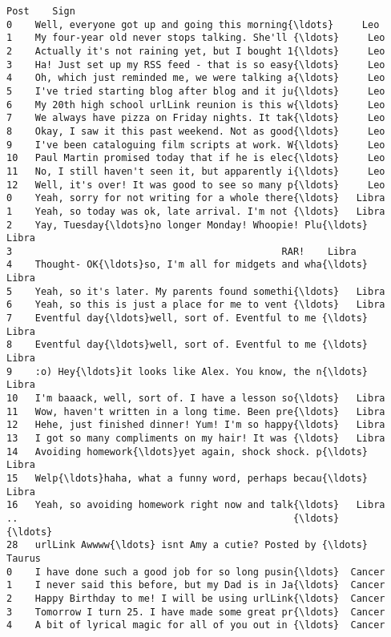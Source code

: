 \documentclass[11pt]{article}
\begin{document}
\begin{Verbatim}[commandchars=\\\{\}]
                                                 Post    Sign  
0    Well, everyone got up and going this morning{\ldots}     Leo  
1    My four-year old never stops talking. She'll {\ldots}     Leo  
2    Actually it's not raining yet, but I bought 1{\ldots}     Leo  
3    Ha! Just set up my RSS feed - that is so easy{\ldots}     Leo  
4    Oh, which just reminded me, we were talking a{\ldots}     Leo  
5    I've tried starting blog after blog and it ju{\ldots}     Leo  
6    My 20th high school urlLink reunion is this w{\ldots}     Leo  
7    We always have pizza on Friday nights. It tak{\ldots}     Leo  
8    Okay, I saw it this past weekend. Not as good{\ldots}     Leo  
9    I've been cataloguing film scripts at work. W{\ldots}     Leo  
10   Paul Martin promised today that if he is elec{\ldots}     Leo  
11   No, I still haven't seen it, but apparently i{\ldots}     Leo  
12   Well, it's over! It was good to see so many p{\ldots}     Leo  
0    Yeah, sorry for not writing for a whole there{\ldots}   Libra  
1    Yeah, so today was ok, late arrival. I'm not {\ldots}   Libra  
2    Yay, Tuesday{\ldots}no longer Monday! Whoopie! Plu{\ldots}   Libra  
3                                               RAR!    Libra  
4    Thought- OK{\ldots}so, I'm all for midgets and wha{\ldots}   Libra  
5    Yeah, so it's later. My parents found somethi{\ldots}   Libra  
6    Yeah, so this is just a place for me to vent {\ldots}   Libra  
7    Eventful day{\ldots}well, sort of. Eventful to me {\ldots}   Libra  
8    Eventful day{\ldots}well, sort of. Eventful to me {\ldots}   Libra  
9    :o) Hey{\ldots}it looks like Alex. You know, the n{\ldots}   Libra  
10   I'm baaack, well, sort of. I have a lesson so{\ldots}   Libra  
11   Wow, haven't written in a long time. Been pre{\ldots}   Libra  
12   Hehe, just finished dinner! Yum! I'm so happy{\ldots}   Libra  
13   I got so many compliments on my hair! It was {\ldots}   Libra  
14   Avoiding homework{\ldots}yet again, shock shock. p{\ldots}   Libra  
15   Welp{\ldots}haha, what a funny word, perhaps becau{\ldots}   Libra  
16   Yeah, so avoiding homework right now and talk{\ldots}   Libra  
..                                                {\ldots}     {\ldots}  
28   urlLink Awwww{\ldots} isnt Amy a cutie? Posted by {\ldots}  Taurus  
0    I have done such a good job for so long pusin{\ldots}  Cancer  
1    I never said this before, but my Dad is in Ja{\ldots}  Cancer  
2    Happy Birthday to me! I will be using urlLink{\ldots}  Cancer  
3    Tomorrow I turn 25. I have made some great pr{\ldots}  Cancer  
4    A bit of lyrical magic for all of you out in {\ldots}  Cancer  

\end{Verbatim}
\end{document}
